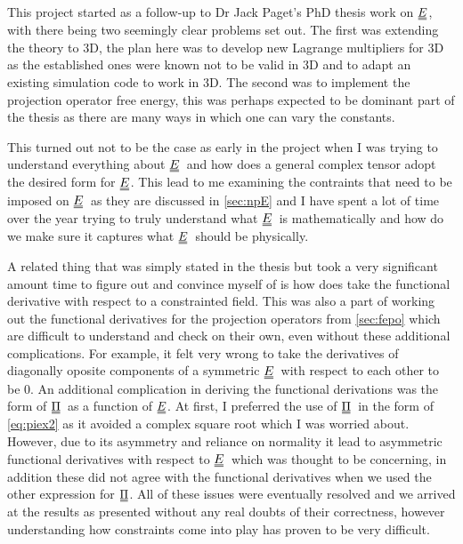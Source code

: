 \documentclass[12pt]{article}
\newcommand{\duf}[2]{\stackunder[0.5pt]{\stackunder[0.8pt]{\stackunder[1pt]{\ensuremath{#1}}{\rule{\widthof{\ensuremath{#2}}*\real{0.9}}{.1ex}}}{\rule{\widthof{\ensuremath{#2}}*\real{0.9}}{.1ex}}}{}}
\newcommand{\du}[1]{\duf{#1}{#1}}
\newcommand{\EE}{\ensuremath{\du{E}}}
\newcommand{\PP}{\ensuremath{\du{\Pi}}}
\begin{document}
\personalstatement
    This project started as a follow-up to Dr Jack Paget's PhD thesis work on \EE, with there being two seemingly clear problems set out.
    The first was extending the theory to 3D, the plan here was to develop new Lagrange multipliers for 3D as the established ones were known not to be valid in 3D and to adapt an existing simulation code to work in 3D.
    The second was to implement the projection operator free energy, this was perhaps expected to be dominant part of the thesis as there are many ways in which one can vary the constants.

    This turned out not to be the case as early in the project when I was trying to understand everything about \EE\ and how does a general complex tensor adopt the desired form for \EE.
    This lead to me examining the contraints that need to be imposed on \EE\ as they are discussed in \cref{sec:npE} and I have spent a lot of time over the year trying to truly understand what \EE\ is mathematically and how do we make sure it captures what \EE\ should be physically.

    A related thing that was simply stated in the thesis but took a very significant amount time to figure out and convince myself of is how does take the functional derivative with respect to a constrainted field.
    This was also a part of working out the functional derivatives for the projection operators from \cref{sec:fepo} which are difficult to understand and check on their own, even without these additional complications.
    For example, it felt very wrong to take the derivatives of diagonally oposite components of a symmetric \EE\ with respect to each other to be 0.
    An additional complication in deriving the functional derivations was the form of \PP\ as a function of \EE.
    At first, I preferred the use of \PP\ in the form of \cref{eq:piex2} as it avoided a complex square root which I was worried about.
    However, due to its asymmetry and reliance on normality it lead to asymmetric functional derivatives with respect to \EE\ which was thought to be concerning, in addition these did not agree with the functional derivatives when we used the other expression for \PP.
    All of these issues were eventually resolved and we arrived at the results as presented without any real doubts of their correctness, however understanding how constraints come into play has proven to be very difficult.
\end{document}
